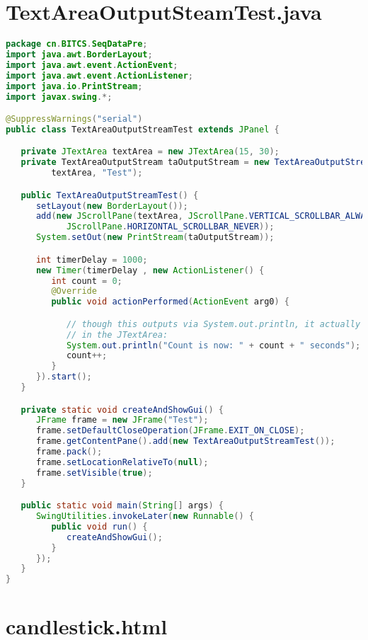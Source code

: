 \section{TextAreaOutputSteamTest.java}
\label{Section A.4}

\begin{lstlisting}[language=java]
package cn.BITCS.SeqDataPre;
import java.awt.BorderLayout;
import java.awt.event.ActionEvent;
import java.awt.event.ActionListener;
import java.io.PrintStream;
import javax.swing.*;

@SuppressWarnings("serial")
public class TextAreaOutputStreamTest extends JPanel {

   private JTextArea textArea = new JTextArea(15, 30);
   private TextAreaOutputStream taOutputStream = new TextAreaOutputStream(
         textArea, "Test");

   public TextAreaOutputStreamTest() {
      setLayout(new BorderLayout());
      add(new JScrollPane(textArea, JScrollPane.VERTICAL_SCROLLBAR_ALWAYS, 
            JScrollPane.HORIZONTAL_SCROLLBAR_NEVER));
      System.setOut(new PrintStream(taOutputStream));

      int timerDelay = 1000;
      new Timer(timerDelay , new ActionListener() {
         int count = 0;
         @Override
         public void actionPerformed(ActionEvent arg0) {

            // though this outputs via System.out.println, it actually displays
            // in the JTextArea:
            System.out.println("Count is now: " + count + " seconds");
            count++;
         }
      }).start();
   }

   private static void createAndShowGui() {
      JFrame frame = new JFrame("Test");
      frame.setDefaultCloseOperation(JFrame.EXIT_ON_CLOSE);
      frame.getContentPane().add(new TextAreaOutputStreamTest());
      frame.pack();
      frame.setLocationRelativeTo(null);
      frame.setVisible(true);
   }

   public static void main(String[] args) {
      SwingUtilities.invokeLater(new Runnable() {
         public void run() {
            createAndShowGui();
         }
      });
   }
}
\end{lstlisting}


\label{Appendix B}

\section{candlestick.html}
\label{Section B.1}


